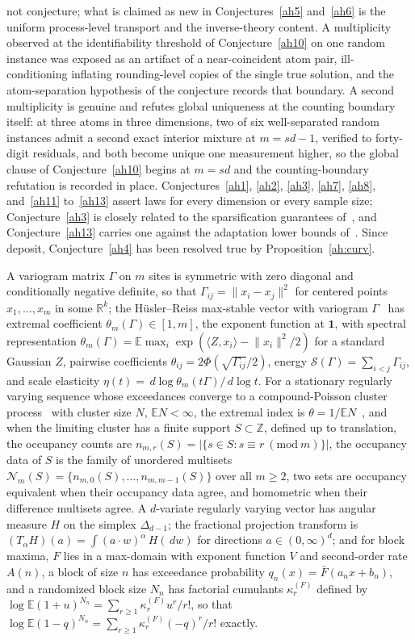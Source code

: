 \documentclass[11pt]{article}
\theoremstyle{definition}
\newcommand{\E}{\mathbb E}
\newcommand{\Z}{\mathbb Z}
\newcommand{\R}{\mathbb R}
\newcommand{\dd}{\,d}
\providecommand{\Z}{\mathbb Z}
\providecommand{\R}{\mathbb R}
\providecommand{\E}{\mathbb E}
\begin{document}
not conjecture; what is claimed as new in Conjectures~\ref{ah5} and~\ref{ah6} is the uniform process-level transport and the inverse-theory content.  A multiplicity observed at the identifiability threshold of Conjecture~\ref{ah10} on one random instance was exposed as an artifact of a near-coincident atom pair, ill-conditioning inflating rounding-level copies of the single true solution, and the atom-separation hypothesis of the conjecture records that boundary.  A second multiplicity is genuine and refutes global uniqueness at the counting boundary itself: at three atoms in three dimensions, two of six well-separated random instances admit a second exact interior mixture at $m=sd-1$, verified to forty-digit residuals, and both become unique one measurement higher, so the global clause of Conjecture~\ref{ah10} begins at $m=sd$ and the counting-boundary refutation is recorded in place.  Conjectures~\ref{ah1}, \ref{ah2}, \ref{ah3}, \ref{ah7}, \ref{ah8}, and~\ref{ah11} to~\ref{ah13} assert laws for every dimension or every sample size; Conjecture~\ref{ah3} is closely related to the sparsification guarantees of~\cite{EAR26}, and Conjecture~\ref{ah13} carries one against the adaptation lower bounds of~\cite{CK15}.  Since deposit, Conjecture~\ref{ah4} has been resolved true by Proposition~\ref{ah:curv}.

A variogram matrix $\Gamma$ on $m$ sites is symmetric with zero diagonal and conditionally negative definite, so that $\Gamma_{ij}=\lVert x_i-x_j\rVert^2$ for centered points $x_1,\ldots,x_m$ in some $\R^k$; the H\"usler--Reiss max-stable vector with variogram $\Gamma$~\cite{HR89} has extremal coefficient $\theta_m(\Gamma)\in[1,m]$, the exponent function at $\mathbf 1$, with spectral representation $\theta_m(\Gamma)=\E\max_i\exp(\langle Z,x_i\rangle-\lVert x_i\rVert^2/2)$ for a standard Gaussian $Z$, pairwise coefficients $\theta_{ij}=2\Phi(\sqrt{\Gamma_{ij}}/2)$, energy $\mathcal S(\Gamma)=\sum_{i<j}\Gamma_{ij}$, and scale elasticity $\eta(t)=\dd\log\theta_m(t\Gamma)/\dd\log t$.  For a stationary regularly varying sequence whose exceedances converge to a compound-Poisson cluster process~\cite{BS09} with cluster size $N$, $\E N<\infty$, the extremal index is $\theta=1/\E N$~\cite{Lea83,OB87}, and when the limiting cluster has a finite support $S\subset\Z$, defined up to translation, the occupancy counts are $n_{m,r}(S)=|\{s\in S:s\equiv r\ (\mathrm{mod}\ m)\}|$, the occupancy data of $S$ is the family of unordered multisets $\mathcal N_m(S)=\{n_{m,0}(S),\ldots,n_{m,m-1}(S)\}$ over all $m\ge2$, two sets are occupancy equivalent when their occupancy data agree, and homometric when their difference multisets agree.  A $d$-variate regularly varying vector has angular measure $H$ on the simplex $\Delta_{d-1}$; the fractional projection transform is $(T_\alpha H)(a)=\int(a\cdot w)^\alpha\,H(\dd w)$ for directions $a\in(0,\infty)^d$; and for block maxima, $F$ lies in a max-domain with exponent function $V$ and second-order rate $A(n)$, a block of size $n$ has exceedance probability $q_n(x)=\bar F(a_nx+b_n)$, and a randomized block size $N_n$ has factorial cumulants $\kappa_r^{(F)}$ defined by $\log\E(1+u)^{N_n}=\sum_{r\ge1}\kappa_r^{(F)}u^r/r!$, so that $\log\E(1-q)^{N_n}=\sum_{r\ge1}\kappa_r^{(F)}(-q)^r/r!$ exactly.
\end{document}
